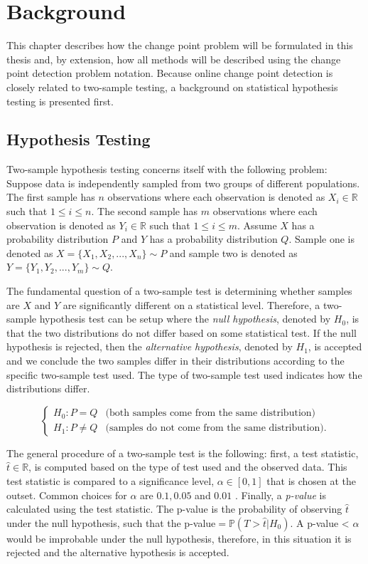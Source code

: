 \chapter{Background}
This chapter describes how the change point problem will be formulated in this thesis and, by extension, how all methods will be described using the change point detection problem notation. Because online change point detection is closely related to two-sample testing, a background on statistical hypothesis testing is presented first. 

\section{Hypothesis Testing}

Two-sample hypothesis testing concerns itself with the following problem: Suppose data is independently sampled from two groups of different populations. The first sample has $n$ observations where each observation is denoted as $X_i \in \mathbb{R}$ such that $1 \leq i \leq n$. The second sample has $m$ observations where each observation is denoted as $Y_i \in \mathbb{R}$ such that $1 \leq i \leq m$.  Assume $X$ has a probability distribution $P$ and $Y$ has a probability distribution $Q$. Sample one is denoted as  $X=\{X_1, X_2, ...,X_n\} \sim P$ and sample two is denoted as $Y=\{Y_1, Y_2, ...,Y_m\} \sim Q$. 

The fundamental question of a two-sample test is determining whether samples are $X$ and $Y$ are significantly different on a statistical level. Therefore, a two-sample hypothesis test can be setup where the \textit{null hypothesis}, denoted by $H_0$, is that the two distributions do not differ based on some statistical test. If the null hypothesis is rejected, then the \textit{alternative hypothesis}, denoted by $H_1$, is accepted and we conclude the two samples differ in their distributions according to the specific two-sample test used. The type of two-sample test used indicates how the distributions differ.

\begin{equation}
  \begin{cases}
    H_0: P = Q & \text{(both samples come from the same distribution)} \\
    H_1: P \neq Q & \text{(samples do not come from the same distribution)}. 
  \end{cases}
\end{equation}

The general procedure of a two-sample test is the following: first, a test statistic, $\hat{t} \in \mathbb{R}$, is computed based on the type of test used and the observed data. This test statistic is compared to a significance level, $\alpha \in [0,1]$ that is chosen  at the outset. Common choices for $\alpha$ are $0.1, 0.05$ and $0.01$ \cite{moore1993introduction}. Finally, a \textit{p-value} is calculated using the test statistic. The p-value is the probability of observing $\hat{t}$ under the null hypothesis, such that the p-value$=\mathbb{P}(T>\hat{t}|H_0)$. A p-value < $\alpha$ would be improbable under the null hypothesis, therefore, in this situation it is rejected and the alternative hypothesis is accepted.

